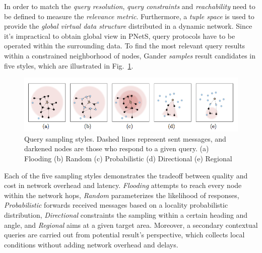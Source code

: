 \documentclass[11pt,onecolumn]{article}
\begin{document}
In order to match the {\em query resolution}, {\em query constraints} and {\em reachability} need to be defined to measure the {\em relevance metric}. Furthermore, a {\em tuple space} is used to provide the {\em global virtual data structure} \cite{picco2002global} distributed in a dynamic network. Since it's impractical to obtain global view in PNetS, query protocols have to be operated within the surrounding data. To find the most relevant query results within a constrained neighborhood of nodes, Gander {\em samples} result candidates in five styles, which are illustrated in Fig.~\ref{gander_sampling}.

\begin{figure}[h]
  \begin{center}
    \includegraphics[width=1.0\textwidth]{resources/gander_sampling.png}
  \end{center}
  \vspace{-20pt}
  \caption{Query sampling styles\cite{michel2013gander}. Dashed lines represent sent messages, and darkened nodes are those who respond to a given query. (a) Flooding (b) Random (c) Probabilistic (d) Directional (e) Regional  \label{gander_sampling}}
    \vspace{-10pt}
\end{figure}

Each of the five sampling styles demonstrates the tradeoff between quality and cost in network overhead and latency. {\em Flooding} attempts to reach every node within the network hops, {\em Random} parameterizes the likelihood of responses, {\em Probabilistic} forwards received messages based on a locality probabilistic distribution, {\em Directional} constraints the sampling within a certain heading and angle, and {\em Regional} aims at a given target area. Moreover, a secondary contextual queries are carried out from potential result's perspective, which collects local conditions without adding network overhead and delays.
\end{document}
